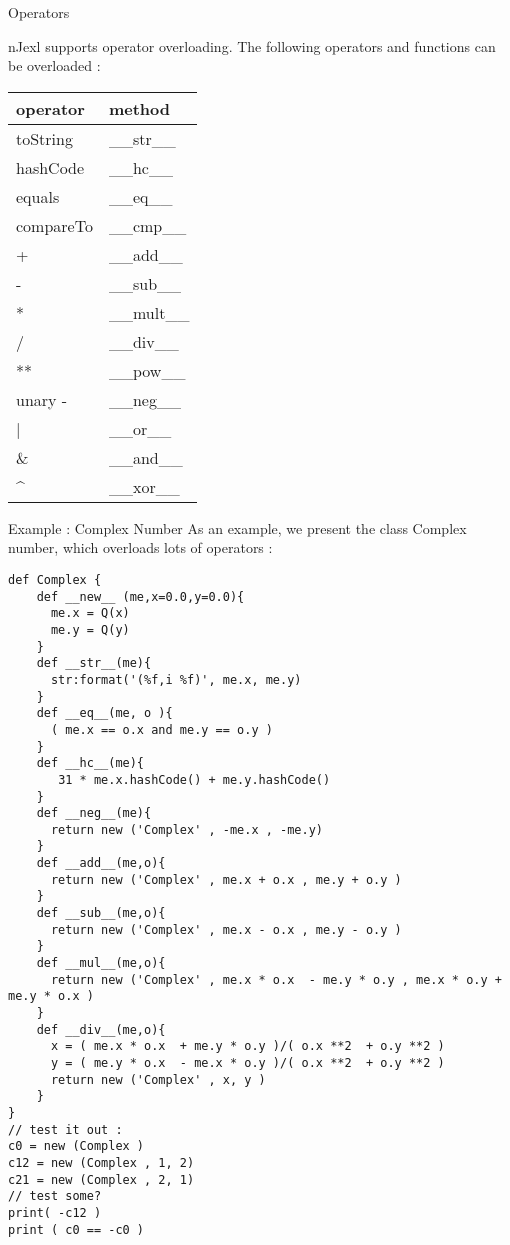 \begin{section}{Operators}

nJexl supports operator overloading.
The following operators and functions can be overloaded :

\begin{center}
\begin{tabular}{| l | l | }
\hline
operator          & method       \\ \hline
toString          & \_\_str\_\_  \\
hashCode          & \_\_hc\_\_   \\
equals            & \_\_eq\_\_   \\
compareTo         & \_\_cmp\_\_  \\
+                 & \_\_add\_\_  \\
-                 & \_\_sub\_\_  \\
*                 & \_\_mult\_\_ \\
/                 & \_\_div\_\_  \\
**                & \_\_pow\_\_  \\
unary -           & \_\_neg\_\_  \\
|                 & \_\_or\_\_   \\
\&                & \_\_and\_\_  \\
\textasciicircum  & \_\_xor\_\_  \\ \hline
\end{tabular}
\end{center}


\begin{subsection}{Example : Complex Number}
As an example, we present the class Complex number, 
which overloads lots of operators :

\begin{center}\begin{minipage}{\linewidth}
\begin{lstlisting}[style=JexlStyle]
def Complex {
    def __new__ (me,x=0.0,y=0.0){
      me.x = Q(x)
      me.y = Q(y) 
    }
    def __str__(me){
      str:format('(%f,i %f)', me.x, me.y)
    }
    def __eq__(me, o ){
      ( me.x == o.x and me.y == o.y )
    }
    def __hc__(me){
       31 * me.x.hashCode() + me.y.hashCode()
    }
    def __neg__(me){
      return new ('Complex' , -me.x , -me.y)
    }
    def __add__(me,o){
      return new ('Complex' , me.x + o.x , me.y + o.y )
    }
    def __sub__(me,o){
      return new ('Complex' , me.x - o.x , me.y - o.y )
    }
    def __mul__(me,o){
      return new ('Complex' , me.x * o.x  - me.y * o.y , me.x * o.y + me.y * o.x )
    }
    def __div__(me,o){
      x = ( me.x * o.x  + me.y * o.y )/( o.x **2  + o.y **2 )
      y = ( me.y * o.x  - me.x * o.y )/( o.x **2  + o.y **2 )
      return new ('Complex' , x, y )
    }
}
// test it out :
c0 = new (Complex )
c12 = new (Complex , 1, 2)
c21 = new (Complex , 2, 1)
// test some?
print( -c12 )
print ( c0 == -c0 )
\end{lstlisting}  
\end{minipage}\end{center}

\end{subsection}
\end{section}

